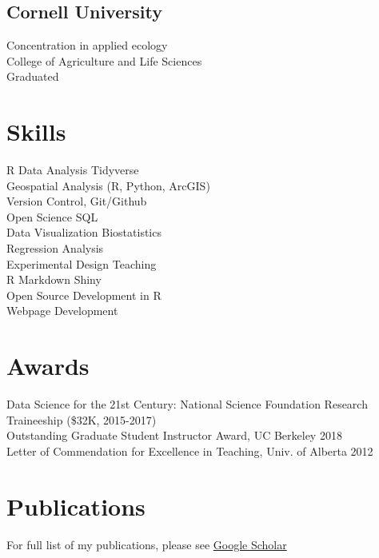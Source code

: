\documentclass[]{deedy-resume-openfont}
\begin{document}
\begin{minipage}[t]{0.32\textwidth}
\subsection{Cornell University}
Concentration in applied ecology \\
College of Agriculture and Life Sciences \\
Graduated 
\sectionsep


\section{Skills}
\textbullet{} R \textbullet{} Data Analysis \textbullet{} Tidyverse \\\textbullet{} Geospatial Analysis (R, Python, ArcGIS) \\\textbullet{} Version Control, Git/Github \\\textbullet{} Open Science \textbullet{} SQL \\\textbullet{} Data Visualization \textbullet{} Biostatistics \\\textbullet{} Regression Analysis \\\textbullet{} Experimental Design \textbullet{} Teaching \\\textbullet{} R Markdown \textbullet{} Shiny \\\textbullet{} Open Source Development in R \\ \textbullet{} Webpage Development
\sectionsep


\section{Awards}

\textbullet{} Data Science for the 21st Century: National Science Foundation Research Traineeship (\$32K, 2015-2017) \\
\textbullet{} Outstanding Graduate Student Instructor Award, UC Berkeley 2018\\
\textbullet{} Letter of Commendation for Excellence in Teaching, Univ. of Alberta 2012\\
\sectionsep

\section{Publications}
For full list of my publications, please see \href{https://scholar.google.com/citations?user=0BKLXCUAAAAJ}{Google Scholar \faGraduationCap} 

%
%

\end{minipage} 
\end{document}
